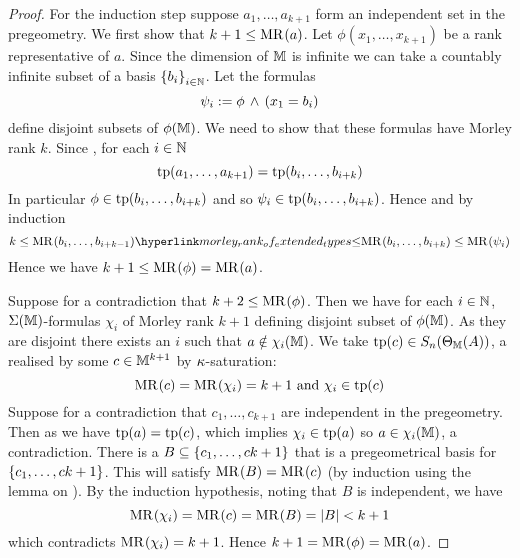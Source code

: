 \begin{proof}
    For the induction step suppose 
    $a_1,\dots,a_{k+1}$ form an independent set in the 
    pregeometry.
    We first show that $k + 1 \leq \mathrm{MR}^{}(a)$.
    Let $\phi(x_1,\dots,x_{k+1})$ be a rank representative of $a$.
    Since the dimension of $\mathbb{M}$ is infinite we can take a countably infinite 
    subset of a basis $\left\{b_i\right\}_{i \in \mathbb{N}}$. 
    Let the formulas 
    \[
        \psi_i := \phi \, \land \, (x_1 = b_i)
    \]
    define disjoint subsets of $\phi(\mathbb{M})$.
    We need to show that these formulas have Morley rank $k$.
    Since , for each $i \in \mathbb{N}$ 
    \[\operatorname{tp}(a_1,\dots,a_{k+1}) = \operatorname{tp}(b_i,\dots,b_{i+k})\]
    In particular $\phi \in \operatorname{tp}(b_i,\dots,b_{i+k})$ and so 
    $\psi_i \in \operatorname{tp}(b_i,\dots,b_{i+k})$.
    Hence and by induction 
    \[
        k \leq \MR{}{b_i,\dots,b_{i+k-1}} 
        \linkto{morley_rank_of_extended_types}{\leq} \MR{}{b_i,\dots,b_{i+k}}
        \leq \MR{}{\psi_i}
    \]
    Hence we have $k + 1 \leq \mathrm{MR}^{}(\phi) = \mathrm{MR}^{}(a)$.

    Suppose for a contradiction that $k + 2 \leq \mathrm{MR}^{}(\phi)$.
    Then we have for each $i \in \mathbb{N}$, $\Sigma(\mathbb{M})$-formulas $\chi_i$
    of Morley rank $k + 1$ defining disjoint subset of $\phi(\mathbb{M})$.
    As they are disjoint there exists an $i$ such that $a \notin \chi_i(\mathbb{M})$.
    We take $\operatorname{tp}(c) \in S_n(\Theta_{\mathbb{M}}(A))$, 
    a 
    realised by some $c \in \mathbb{M}^{k+1}$ by $\kappa$-saturation:
    \[\mathrm{MR}^{}(c) = \mathrm{MR}^{}(\chi_i) = k + 1 \text{ and } \chi_i \in \operatorname{tp}(c)\]
    Suppose for a contradiction that $c_1,\dots,c_{k+1}$ are independent in the 
    pregeometry.
    Then as  we have $\operatorname{tp}(a) = \operatorname{tp}(c)$,
    which implies $\chi_i \in \operatorname{tp}(a)$ so $a \in \chi_i(\mathbb{M})$, a contradiction.
    There is a 
    $B \subseteq \left\{c_1,\dots,c{k+1}\right\}$ 
    that is a pregeometrical basis for $\left\{c_1,\dots,c{k+1}\right\}$.
    This will satisfy $\mathrm{MR}^{}(B) = \mathrm{MR}^{}(c)$ (by induction using the lemma on 
    ).
    By the induction hypothesis, noting that $B$ is independent, we have
    \[\mathrm{MR}^{}(\chi_i) = \mathrm{MR}^{}(c) = \mathrm{MR}^{}(B) = \left\vert B \right\vert < k + 1\]
    which contradicts $\mathrm{MR}^{}(\chi_i) = k + 1$.
    Hence $k + 1 = \mathrm{MR}^{}(\phi) = \mathrm{MR}^{}(a)$.
\end{proof}

